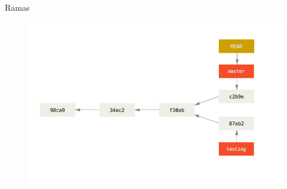 \documentclass{beamer}
\begin{document}
\begin{frame}{Ramas}
\begin{figure}
	\centering
	\includegraphics[width=1\linewidth]{img/8}
	\label{fig:8}
\end{figure}
\end{frame}
\end{document}
